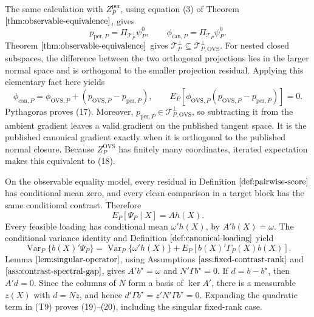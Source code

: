 The same calculation with \(Z_P^{\mathrm{per}}\), using equation (3) of Theorem \(\ref{thm:observable-equivalence}\), gives
\[
p_{\mathrm{per},P}=\Pi_{\mathcal T_P^\perp}\psi_P^0,
\qquad
\phi_{\mathrm{can},P}=\Pi_{\mathcal T_P}\psi_P^0.
\tag{T7}
\]
Theorem \(\ref{thm:observable-equivalence}\) gives \(\mathcal T_P^\perp\subseteq\mathcal T_{P,\mathrm{OVS}}^\perp\).  For nested closed subspaces, the difference between the two orthogonal projections lies in the larger normal space and is orthogonal to the smaller projection residual.  Applying this elementary fact here yields
\[
\phi_{\mathrm{can},P}
=\phi_{\mathrm{OVS},P}+(p_{\mathrm{OVS},P}-p_{\mathrm{per},P}),
\qquad
E_P[\phi_{\mathrm{OVS},P}(p_{\mathrm{OVS},P}-p_{\mathrm{per},P})]=0.
\]
Pythagoras proves (17).  Moreover, \(p_{\mathrm{per},P}\in\mathcal T_{P,\mathrm{OVS}}^\perp\), so subtracting it from the ambient gradient leaves a valid gradient on the published tangent space.  It is the published canonical gradient exactly when it is orthogonal to the published normal closure.  Because \(Z_P^{\mathrm{OVS}}\) has finitely many coordinates, iterated expectation makes this equivalent to (18).

On the observable equality model, every residual in Definition \(\ref{def:pairwise-score}\) has conditional mean zero, and every clean comparison in a target block has the same conditional contrast.  Therefore
\[
E_P[\Psi_P\mid X]=Ah(X).
\tag{T8}
\]
Every feasible loading has conditional mean \(\omega'h(X)\), by \(A'b(X)=\omega\).  The conditional variance identity and Definition \(\ref{def:canonical-loading}\) yield
\[
\operatorname{Var}_P\{b(X)'\Psi_P\}
=\operatorname{Var}_P\{\omega'h(X)\}
+E_P[b(X)'\Gamma_P(X)b(X)].
\tag{T9}
\]
Lemma \(\ref{lem:singular-operator}\), using Assumptions \(\ref{ass:fixed-contrast-rank}\) and \(\ref{ass:contrast-spectral-gap}\), gives \(A'b^\star=\omega\) and \(N'\Gamma b^\star=0\).  If \(d=b-b^\star\), then \(A'd=0\).  Since the columns of \(N\) form a basis of \(\ker A'\), there is a measurable \(z(X)\) with \(d=Nz\), and hence \(d'\Gamma b^\star=z'N'\Gamma b^\star=0\).  Expanding the quadratic term in (T9) proves (19)--(20), including the singular fixed-rank case.

